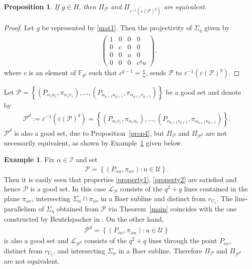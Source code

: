 \documentclass[11pt]{article}
\newtheorem{prop}[theorem]{Proposition}
\theoremstyle{definition}
\newtheorem{exa}[theorem]{Example}
\numberwithin{equation}{section}
\def\eps{\varepsilon}
\def\cI{\mathcal I}
\def\cL{\mathcal L}
\def\cP{\mathcal P}
\def\cU{\mathcal U}
\def\F{{\mathbb F}}
\begin{document}
\begin{prop}
    If $g \in H$, then $\Pi_{\cP}$ and $\Pi_{\eps^{-1}\left( \eps(\cP)^g \right)}$ are equivalent.
\end{prop}
\begin{proof}
Let $g$ be represented by \eqref{mat1}. Then the projectivity of $\Sigma_{\eta}$ given by 
\begin{align*}
    & \begin{pmatrix}
        1 & 0 & 0 & 0 \\
        0 & c & 0 & 0 \\
        0 & 0 & u & 0 \\
        0 & 0 & 0 & c^q u
    \end{pmatrix}, 
\end{align*}
where $c$ is an element of $\F_{q^2}$ such that $c^{q-1} = \frac{v}{u}$, sends $\cP$ to $\eps^{-1}\left( \eps(\cP)^g \right)$.
\end{proof}
Let $\cP = \left\{\left(P_{\alpha_1 u_1}, \pi_{\alpha_1 v_1}\right), \dots, \left(P_{\alpha_{q+1} u_{q+1}}, \pi_{\alpha_{q+1} v_{q+1}}\right)\right\}$ be a good set and denote by 
\begin{align*}
    \cP^d := \eps^{-1}\left( \eps(\cP)^\delta \right) = \left\{\left(P_{\alpha_1 v_1}, \pi_{\alpha_1 u_1}\right), \dots, \left(P_{\alpha_{q+1} v_{q+1}}, \pi_{\alpha_{q+1} u_{q+1}}\right)\right\}.
\end{align*}
$\cP^d$ is also a good set, due to Proposition~\ref{prop4}, but $\Pi_{\cP}$ and $\Pi_{\cP^d}$ are not necessarily equivalent, as shown by Example~\ref{Beutelspacher} given below. 
\begin{exa}\label{Beutelspacher}
Fix $\alpha \in \cI$ and set 
\begin{align*}
\cP = \left\{ \left(P_{\alpha u}, \pi_{\alpha v}\right) \colon u \in \cU\right\}.
\end{align*}
Then it is easily seen that properties \eqref{property1}, \eqref{property2} are satisfied
and hence $\cP$ is a good set. In this case $\cL_{\cP}$ consists of the $q^2+q$ lines contained in the plane $\pi_{\alpha v}$, intersecting $\Sigma_{\alpha} \cap \pi_{\alpha v}$ in a Baer subline and distinct from $r_{U_1}$. The line-parallelism of $\Sigma_{\eta}$ obtained from $\cP$ via Theorem~\ref{main} coincides with the one constructed by Beutelspacher in \cite{beutelspacher1974parallelisms}. On the other hand, 
\begin{align*}
\cP^d = \left\{ \left(P_{\alpha v}, \pi_{\alpha u}\right) \colon u \in \cU\right\}
\end{align*}
is also a good set and $\cL_{\cP^d}$ consists of the $q^2+q$ lines through the point $P_{\alpha v}$, distinct from $r_{U_1}$, and intersecting $\Sigma_{\alpha}$ in a Baer subline. Therefore $\Pi_{\cP}$ and $\Pi_{\cP^d}$ are not equivalent.
\end{exa}
\end{document}
